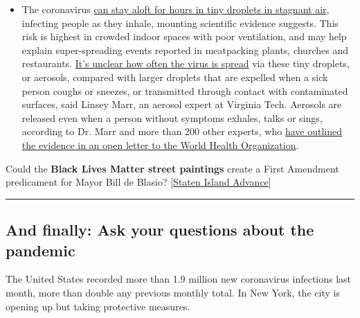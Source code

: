 \begin{itemize}
  \begin{itemize}
  \tightlist
  \item
    The coronavirus
    \href{https://www.nytimes3xbfgragh.onion/2020/07/04/health/239-experts-with-one-big-claim-the-coronavirus-is-airborne.html?action=click\&pgtype=Article\&state=default\&region=MAIN_CONTENT_3\&context=storylines_faq}{can
    stay aloft for hours in tiny droplets in stagnant air}, infecting
    people as they inhale, mounting scientific evidence suggests. This
    risk is highest in crowded indoor spaces with poor ventilation, and
    may help explain super-spreading events reported in meatpacking
    plants, churches and restaurants.
    \href{https://www.nytimes3xbfgragh.onion/2020/07/06/health/coronavirus-airborne-aerosols.html?action=click\&pgtype=Article\&state=default\&region=MAIN_CONTENT_3\&context=storylines_faq}{It's
    unclear how often the virus is spread} via these tiny droplets, or
    aerosols, compared with larger droplets that are expelled when a
    sick person coughs or sneezes, or transmitted through contact with
    contaminated surfaces, said Linsey Marr, an aerosol expert at
    Virginia Tech. Aerosols are released even when a person without
    symptoms exhales, talks or sings, according to Dr. Marr and more
    than 200 other experts, who
    \href{https://academic.oup.com/cid/article/doi/10.1093/cid/ciaa939/5867798}{have
    outlined the evidence in an open letter to the World Health
    Organization}.
  \end{itemize}
\end{itemize}

Could the \textbf{Black Lives Matter street paintings} create a First
Amendment predicament for Mayor Bill de Blasio?
{[}\href{https://www.silive.com/news/2020/08/street-murals-may-create-a-first-amendment-predicament-for-de-blasio.html}{Staten
Island Advance}{]}

\begin{center}\rule{0.5\linewidth}{\linethickness}\end{center}

\hypertarget{and-finally-ask-your-questions-about-the-pandemic}{%
\subsection{And finally: Ask your questions about the
pandemic}\label{and-finally-ask-your-questions-about-the-pandemic}}

The United States recorded more than 1.9 million new coronavirus
infections last month, more than double any previous monthly total. In
New York, the city is opening up but taking protective measures.

